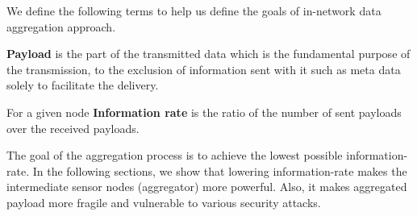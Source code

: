 	We define the following terms to help us define the goals of in-network data aggregation approach.
	\begin{definition}\label{def:payload}\cite{PayloadWiKi}
		\textbf{Payload} is the part of the transmitted data which is the fundamental purpose of the transmission, to the exclusion of information sent with it such as meta data solely to facilitate the delivery.
	\end{definition}
	\begin{definition}\label{def:information-rate}
		For a given node \textbf {Information rate} is the ratio of the number of sent payloads over the received payloads.
	\end{definition}
	The goal of the aggregation process is to achieve the lowest possible information-rate.
	In the following sections, we show that lowering information-rate makes the intermediate sensor nodes (aggregator) more powerful.
	Also, it makes aggregated payload more fragile and vulnerable to various security attacks.

